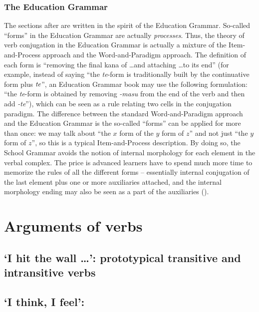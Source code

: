 \documentclass[UTF8, a4paper, oneside, scheme=plain]{ctexrep}
\newcommand{\corpus}[1]{\emph{#1}}
\newcommand{\translate}[1]{`#1'}
\begin{document}
\subsection{The Education Grammar}

The sections after  are written in the spirit of the Education Grammar.
So-called ``forms'' in the Education Grammar are actually \emph{processes}.
Thus, the theory of verb conjugation in the Education Grammar 
is actually a mixture of the Item-and-Process approach and the Word-and-Paradigm approach.
The definition of each form is 
``removing the final kana of \dots and attaching \dots to its end''
(for example, instead of saying ``the \corpus{te}-form is traditionally built by 
the continuative form plus $\corpus{te}$'',
an Education Grammar book may use the following formulation:
``the \corpus{te}-form is obtained by removing \corpus{-masu} from the end of the verb 
and then add \corpus{-te}''),
which can be seen as a rule relating two cells in the conjugation paradigm.
The difference between the standard Word-and-Paradigm approach and the Education Grammar 
is the so-called ``forms'' can be applied for more than once:
we may talk about ``the $x$ form of the $y$ form of $z$''
and not just ``the $y$ form of $z$'',
so this is a typical Item-and-Process description.
By doing so, the School Grammar avoids 
the notion of internal morphology for each element in the verbal complex.
The price is advanced learners have to spend much more time to memorize the rules of all the different forms 
-- essentially internal conjugation of the last element plus one or more auxiliaries attached,
and the internal morphology ending may also be seen as a part of the auxiliaries 
().

\chapter{Arguments of verbs}\label{chap:arguments}

\section{\translate{I hit the wall \dots}: prototypical transitive and intransitive verbs}

\section{\translate{I think, I feel}: }
\end{document}
